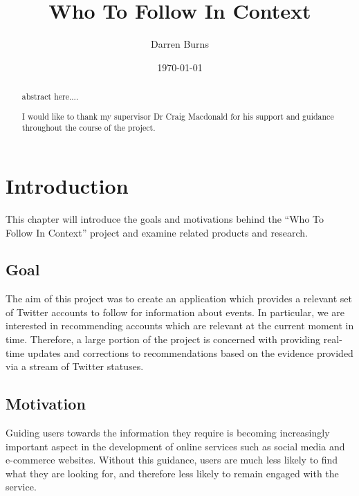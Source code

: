 \documentclass{l4proj}
\begin{document}
\title{Who To Follow In Context}
\author{Darren Burns}
\date{\today}
\maketitle

\begin{abstract}

abstract here....

\end{abstract}

\renewcommand{\abstractname}{Acknowledgements}
\begin{abstract}
I would like to thank my supervisor Dr Craig Macdonald for his support and guidance throughout the course of the project.
\end{abstract}


\educationalconsent
%
%
\tableofcontents

\chapter{Introduction}

This chapter will introduce the goals and motivations behind the ``Who To Follow In Context'' project and examine related products and research.

\section{Goal}
The aim of this project was to create an application which provides a relevant set of Twitter accounts to follow for information about events. In particular, we are interested in recommending accounts which are relevant at the current moment in time. Therefore, a large portion of the project is concerned with providing real-time updates and corrections to recommendations based on the evidence provided via a stream of Twitter statuses.


\section{Motivation}
Guiding users towards the information they require is becoming increasingly important aspect in the development of online services such as social media and e-commerce websites. Without this guidance, users are much less likely to find what they are looking for, and therefore less likely to remain engaged with the service.
\end{document}

